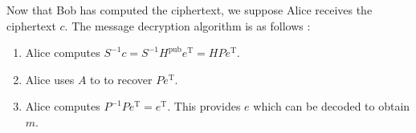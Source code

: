 Now that Bob has computed the ciphertext, we suppose Alice receives the ciphertext $c$. The message decryption algorithm is as follows \cite{80003180051}:

\begin{enumerate}
    \item Alice computes $S^{-1}c = S^{-1}H^{\mathrm{pub}}e^\mathrm{T} = HPe^\mathrm{T}$.
    
    \item Alice uses $A$ to to recover $Pe^{\mathrm{T}}$.
    
    \item Alice computes $P^{-1}Pe^{\mathrm{T}} = e^\mathrm{T}$. This provides $e$ which can be decoded to obtain $m$.
\end{enumerate}